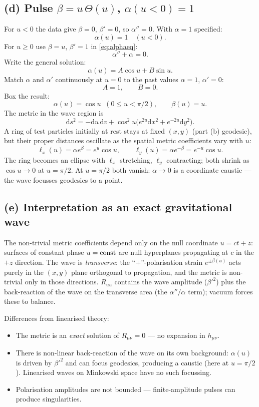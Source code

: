 \documentclass[11pt]{article}
\newcommand{\de}{\mathrm{d}}
\begin{document}
\subsection*{(d) Pulse $\beta=u\,\Theta(u)$, $\alpha(u<0)=1$}

For $u<0$ the data give $\beta=0$, $\beta'=0$, so $\alpha''=0$.  With $\alpha=1$ specified:
\[
\alpha(u)=1\quad(u<0).
\]
For $u\ge 0$ use $\beta=u$, $\beta'=1$ in \eqref{eq:alphaeq}:
\[
\alpha''+\alpha=0.
\]
Write the general solution:
\[
\alpha(u)=A\cos u+B\sin u.
\]
Match $\alpha$ and $\alpha'$ continuously at $u=0$ to the past values $\alpha=1$, $\alpha'=0$:
\[
A=1,\qquad B=0.
\]
Box the result:
\begin{equation}
\boxed{\;\alpha(u)=\cos u\;\;(0\le u<\pi/2),\qquad \beta(u)=u.\;}
\label{eq:alpha-pulse}
\end{equation}
The metric in the wave region is
\[
\de s^{2}=-\de u\,\de v+\cos^{2}\!u\bigl(e^{2u}\de x^{2}+e^{-2u}\de y^{2}\bigr).
\]
A ring of test particles initially at rest stays at fixed $(x,y)$ (part (b) geodesic), but their proper distances oscillate as the spatial metric coefficients vary with $u$:
\[
\ell_{x}(u)=\alpha e^{\beta}=e^{u}\cos u,\qquad \ell_{y}(u)=\alpha e^{-\beta}=e^{-u}\cos u.
\]
The ring becomes an ellipse with $\ell_{x}$ stretching, $\ell_{y}$ contracting; both shrink as $\cos u\to 0$ at $u=\pi/2$.  At $u=\pi/2$ both vanish: $\alpha\to 0$ is a coordinate caustic — the wave focusses geodesics to a point.

\subsection*{(e) Interpretation as an exact gravitational wave}

The non-trivial metric coefficients depend only on the null coordinate $u=ct+z$: surfaces of constant phase $u={\rm const}$ are null hyperplanes propagating at $c$ in the $+z$ direction.  The wave is \emph{transverse}: the ``$+$''-polarisation strain $e^{\pm\beta(u)}$ acts purely in the $(x,y)$ plane orthogonal to propagation, and the metric is non-trivial only in those directions.  $R_{uu}$ contains the wave amplitude ($\beta'^{2}$) plus the back-reaction of the wave on the transverse area (the $\alpha''/\alpha$ term); vacuum forces these to balance.

Differences from linearised theory:
\begin{itemize}
\item The metric is an \emph{exact} solution of $R_{\mu\nu}=0$ — no expansion in $h_{\mu\nu}$.
\item There is non-linear back-reaction of the wave on its own background: $\alpha(u)$ is driven by $\beta'^{2}$ and can focus geodesics, producing a caustic (here at $u=\pi/2$).  Linearised waves on Minkowski space have no such focussing.
\item Polarisation amplitudes are not bounded — finite-amplitude pulses can produce singularities.
\end{itemize}
\end{document}
